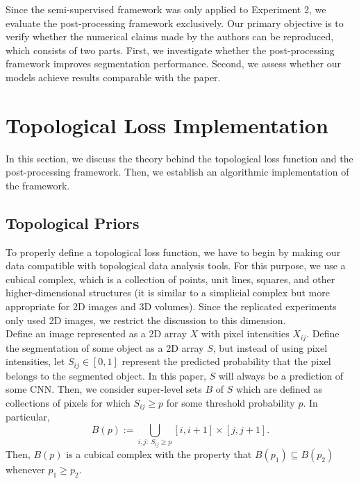 Since the semi-supervised framework was only applied to Experiment 2, we evaluate the post-processing framework exclusively.
Our primary objective is to verify whether the numerical claims made by the authors can be reproduced, which consists of two parts. First, we investigate whether the post-processing framework improves segmentation performance. Second, we assess whether our models achieve results comparable with the paper.

\section{Topological Loss Implementation}

In this section, we discuss the theory behind the topological loss function and the post-processing framework. Then, we establish an algorithmic implementation of the framework.

\subsection{Topological Priors}

To properly define a topological loss function, we have to begin by making our data compatible with topological data analysis tools. For this purpose, we use a cubical complex, which is a collection of points, unit lines, squares, and other higher-dimensional structures (it is similar to a simplicial complex but more appropriate for 2D images and 3D volumes). Since the replicated experiments only used 2D images, we restrict the discussion to this dimension. \\

Define an image represented as a 2D array $X$ with pixel intensities $X_{ij}$. Define the segmentation of some object as a 2D array $S$, but instead of using pixel intensities, let $S_{ij} \in [0,1]$ represent the predicted probability that the pixel belongs to the segmented object. In this paper, $S$ will always be a prediction of some CNN. Then, we consider super-level sets $B$ of $S$ which are defined as collections of pixels for which $S_{ij} \geq p$ for some threshold probability $p$. In particular,
\[
B(p) := \bigcup_{i,j \colon \ S_{ij} \geq p} [i, i+1]\times[j, j+1].
\]
Then, $B(p)$ is a cubical complex with the property that $B(p_1) \subseteq B(p_2)$ whenever $p_1 \geq p_2$. \\

